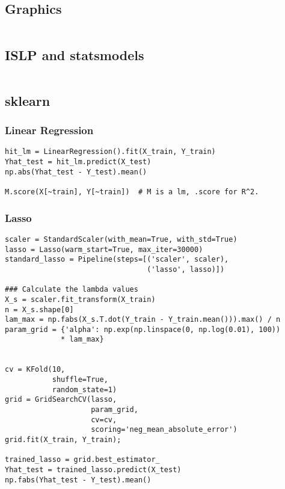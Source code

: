 \documentclass[
  letterpaper,
  DIV=11,
  numbers=noendperiod]{scrreprt}
\begin{document}
\subsection{Graphics}\label{graphics-8}

\begin{verbatim}

\end{verbatim}

\subsection{ISLP and statsmodels}\label{islp-and-statsmodels-6}

\begin{verbatim}

\end{verbatim}

\subsection{sklearn}\label{sklearn-6}

\subsubsection{Linear Regression}\label{linear-regression}

\begin{verbatim}
hit_lm = LinearRegression().fit(X_train, Y_train)
Yhat_test = hit_lm.predict(X_test)
np.abs(Yhat_test - Y_test).mean()

M.score(X[~train], Y[~train])  # M is a lm, .score for R^2. 
\end{verbatim}

\subsubsection{Lasso}\label{lasso}

\begin{verbatim}
scaler = StandardScaler(with_mean=True, with_std=True)
lasso = Lasso(warm_start=True, max_iter=30000)
standard_lasso = Pipeline(steps=[('scaler', scaler),
                                 ('lasso', lasso)])

### Calculate the lambda values
X_s = scaler.fit_transform(X_train)
n = X_s.shape[0]
lam_max = np.fabs(X_s.T.dot(Y_train - Y_train.mean())).max() / n 
param_grid = {'alpha': np.exp(np.linspace(0, np.log(0.01), 100))
             * lam_max}
             

cv = KFold(10,
           shuffle=True,
           random_state=1)
grid = GridSearchCV(lasso,
                    param_grid,
                    cv=cv,
                    scoring='neg_mean_absolute_error')
grid.fit(X_train, Y_train);

trained_lasso = grid.best_estimator_
Yhat_test = trained_lasso.predict(X_test)
np.fabs(Yhat_test - Y_test).mean()
\end{verbatim}
\end{document}
